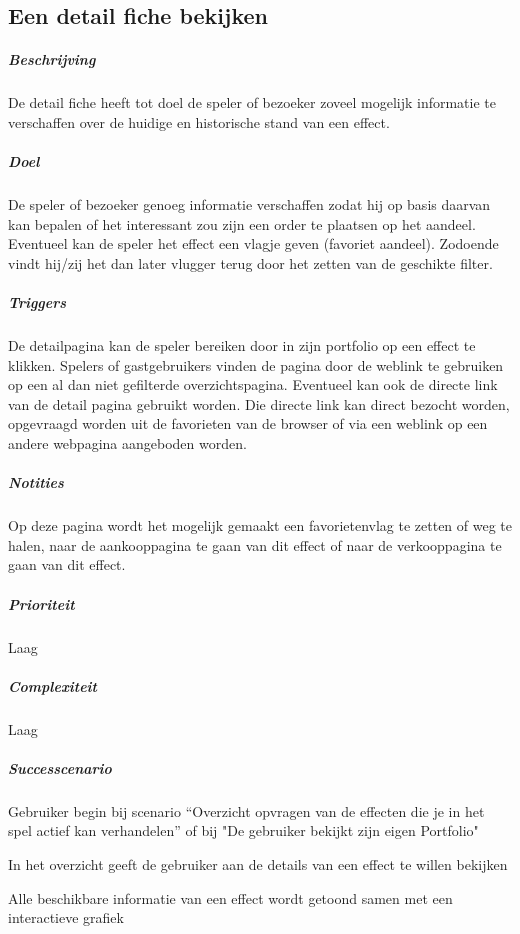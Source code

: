 \subsection{Een detail fiche bekijken}
\begin{compact}
\subparagraph{Beschrijving} De detail fiche heeft tot doel de speler of bezoeker zoveel mogelijk informatie te verschaffen over de huidige en historische stand van een effect.
\subparagraph{Doel} De speler of bezoeker genoeg informatie verschaffen zodat hij op basis daarvan kan bepalen of het interessant zou zijn een order te plaatsen op het aandeel. Eventueel kan de speler het effect een vlagje geven (favoriet aandeel). Zodoende vindt hij/zij het dan later vlugger terug door het zetten van de geschikte filter.
\subparagraph{Triggers} De detailpagina kan de speler bereiken door in zijn portfolio op een effect te klikken. Spelers of gastgebruikers vinden de pagina door de weblink te gebruiken op een al dan niet gefilterde overzichtspagina. Eventueel kan ook de directe link van de detail pagina gebruikt worden. Die directe link kan direct bezocht worden, opgevraagd worden uit de favorieten van de browser of via een weblink op een andere webpagina aangeboden worden.
\subparagraph{Notities} Op deze pagina wordt het mogelijk gemaakt een favorietenvlag te zetten of weg te halen, naar de aankooppagina te gaan van dit effect of naar de verkooppagina te gaan van dit effect.
\subparagraph{Prioriteit}Laag
\subparagraph{Complexiteit}Laag
\subparagraph{Successcenario}
\begin{enumerate_compact}
 \item Gebruiker begin bij scenario ``Overzicht opvragen van de effecten die je in het spel actief kan verhandelen'' of bij "De gebruiker bekijkt zijn eigen Portfolio"
 \item In het overzicht geeft de gebruiker aan de details van een effect te willen bekijken
 \item Alle beschikbare informatie van een effect wordt getoond samen met een interactieve grafiek
\end{enumerate_compact}
\end{compact}

